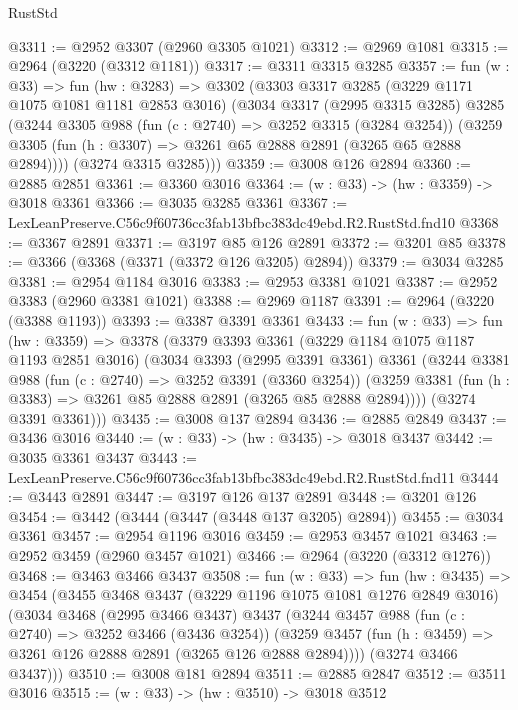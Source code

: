 \begin{lexlean}{RustStd}
\begin{coremodule}
@3311 := @2952 @3307 (@2960 @3305 @1021)
@3312 := @2969 @1081
@3315 := @2964 (@3220 (@3312 @1181))
@3317 := @3311 @3315 @3285
@3357 := fun (w : @33) =>
  fun (hw : @3283) =>
  @3302
    (@3303
      @3317
      @3285
      (@3229 @1171 @1075 @1081 @1181 @2853 @3016)
      (@3034
        @3317
        (@2995 @3315 @3285)
        @3285
        (@3244
          @3305
          @988
          (fun (c : @2740) => @3252 @3315 (@3284 @3254))
          (@3259 @3305 (fun (h : @3307) => @3261 @65 @2888 @2891 (@3265 @65 @2888 @2894))))
        (@3274 @3315 @3285)))
@3359 := @3008 @126 @2894
@3360 := @2885 @2851
@3361 := @3360 @3016
@3364 := (w : @33) -> (hw : @3359) -> @3018 @3361
@3366 := @3035 @3285 @3361
@3367 := LexLeanPreserve.C56c9f60736cc3fab13bfbc383dc49ebd.R2.RustStd.fnd10
@3368 := @3367 @2891
@3371 := @3197 @85 @126 @2891
@3372 := @3201 @85
@3378 := @3366 (@3368 (@3371 (@3372 @126 @3205) @2894))
@3379 := @3034 @3285
@3381 := @2954 @1184 @3016
@3383 := @2953 @3381 @1021
@3387 := @2952 @3383 (@2960 @3381 @1021)
@3388 := @2969 @1187
@3391 := @2964 (@3220 (@3388 @1193))
@3393 := @3387 @3391 @3361
@3433 := fun (w : @33) =>
  fun (hw : @3359) =>
  @3378
    (@3379
      @3393
      @3361
      (@3229 @1184 @1075 @1187 @1193 @2851 @3016)
      (@3034
        @3393
        (@2995 @3391 @3361)
        @3361
        (@3244
          @3381
          @988
          (fun (c : @2740) => @3252 @3391 (@3360 @3254))
          (@3259 @3381 (fun (h : @3383) => @3261 @85 @2888 @2891 (@3265 @85 @2888 @2894))))
        (@3274 @3391 @3361)))
@3435 := @3008 @137 @2894
@3436 := @2885 @2849
@3437 := @3436 @3016
@3440 := (w : @33) -> (hw : @3435) -> @3018 @3437
@3442 := @3035 @3361 @3437
@3443 := LexLeanPreserve.C56c9f60736cc3fab13bfbc383dc49ebd.R2.RustStd.fnd11
@3444 := @3443 @2891
@3447 := @3197 @126 @137 @2891
@3448 := @3201 @126
@3454 := @3442 (@3444 (@3447 (@3448 @137 @3205) @2894))
@3455 := @3034 @3361
@3457 := @2954 @1196 @3016
@3459 := @2953 @3457 @1021
@3463 := @2952 @3459 (@2960 @3457 @1021)
@3466 := @2964 (@3220 (@3312 @1276))
@3468 := @3463 @3466 @3437
@3508 := fun (w : @33) =>
  fun (hw : @3435) =>
  @3454
    (@3455
      @3468
      @3437
      (@3229 @1196 @1075 @1081 @1276 @2849 @3016)
      (@3034
        @3468
        (@2995 @3466 @3437)
        @3437
        (@3244
          @3457
          @988
          (fun (c : @2740) => @3252 @3466 (@3436 @3254))
          (@3259 @3457 (fun (h : @3459) => @3261 @126 @2888 @2891 (@3265 @126 @2888 @2894))))
        (@3274 @3466 @3437)))
@3510 := @3008 @181 @2894
@3511 := @2885 @2847
@3512 := @3511 @3016
@3515 := (w : @33) -> (hw : @3510) -> @3018 @3512

\end{coremodule}
\end{lexlean}
